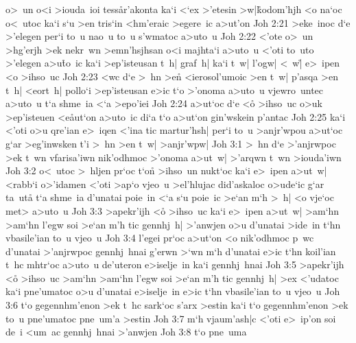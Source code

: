 o>~un
o<i
>iouda~ioi
tess\r{a}r'akonta
ka`i
<`ex
>'etesin
>w|\r{k}odom'hjh
<o
na`oc
o<~utoc
ka`i
s`u
>en
tris`in
<hm'eraic
>egere~ic
a>ut'on\bibvsend
\vs Joh 2:21
>eke~inoc
d`e
>'elegen
per`i
to~u
nao~u
to~u
s'wmatoc
a>uto~u\bibvsend
\vs Joh 2:22
<'ote
o>~un
>hg'erjh
>ek
nekr~wn
>emn'hsjhsan
o<i
majhta`i
a>uto~u
<'oti
to~uto
>'elegen
a>u\r{t}o~ic
ka`i
>ep'isteusan
t~h|
graf~h|
ka`i
t~w|
l'ogw|
<~w|\r{}
e>~ipen
<o
>ihso~uc\bibvsend
\vs Joh 2:23
<wc
d`e
>~hn
>e\r{n}
<ierosol'umoic
>en
t~w|
p'asqa
>en
t~h|
<eort~h|
pollo`i
>ep'isteusan
e>ic
t`o
>'onoma
a>uto~u
vjewro~untec
a>uto~u
t`a
shme~ia
<`a
>epo'iei\bibvsend
\vs Joh 2:24
a>ut`oc
d`e
<o\r{}
>ihso~uc
o>uk
>ep'isteuen
<e\r{a}ut`on
a>uto~ic
di`a
t`o
a>ut`on
gin'wskein
p'antac\bibvsend
\vs Joh 2:25
ka`i
<'oti
o>u
qre'ian
e>~iqen
<'ina
tic
martur'hsh|
per`i
to~u
>anjr'wpou
a>ut`oc
g`ar
>eg'inwsken
t'i
>~hn
>en
t~w|
>anjr'wpw|\bibvsend
\vs Joh 3:1
>~hn
d`e
>'anjrwpoc
>ek
t~wn
vfarisa'iwn
nik'odhmoc
>'onoma
a>ut~w|
>'arqwn
t~wn
>iouda'iwn\bibvsend
\vs Joh 3:2
o<~utoc
>~hljen
pr`oc
t`on\r{}
>ihso~un
nukt`oc
ka`i
e>~ipen
a>ut~w|
<rabb`i
o>'idamen
<'oti
>ap`o
vjeo~u
>el'hlujac
did'askaloc
o>ude`ic
g`ar
ta~uta\r{}
t`a
shme~ia
d'unatai
poie~in
<`a
s`u
poie~ic
>e`an
m`h
>~h|
<o
vje`oc
met>
a>uto~u\bibvsend
\vs Joh 3:3
>apekr'ijh
<o\r{}
>ihso~uc
ka`i
e>~ipen
a>ut~w|
>am`hn
>am`hn
l'egw
soi
>e`an
m'h
tic
gennhj~h|
>'anwjen
o>u
d'unatai
>ide~in
t`hn
vbasile'ian
to~u
vjeo~u\bibvsend
\vs Joh 3:4
l'egei
pr`oc
a>ut`on
<o
nik'odhmoc
p~wc
d'unatai
>'anjrwpoc
gennhj~hnai
g'erwn
>`wn
m`h
d'unatai
e>ic
t`hn
koil'ian
t~hc
mhtr`oc
a>uto~u
de'uteron
e>iselje~in
ka`i
gennhj~hnai\bibvsend
\vs Joh 3:5
>apekr'ijh
<o\r{}
>ihso~uc
>am`hn
>am`hn
l'egw
soi
>e`an
m'h
tic
gennhj~h|
>ex
<'udatoc
ka`i
pne'umatoc
o>u
d'unatai
e>iselje~in
e>ic
t`hn
vbasile'ian
to~u
vjeo~u\bibvsend
\vs Joh 3:6
t`o
gegennhm'enon
>ek
t~hc
sark`oc
s'arx
>estin
ka`i
t`o
gegennhm'enon
>ek
to~u
pne'umatoc
pne~um'a
>estin\bibvsend
\vs Joh 3:7
m`h
vjaum'ash|c
<'oti
e>~ip'on
soi
de~i
<um~ac
gennhj~hnai
>'anwjen\bibvsend
\vs Joh 3:8
t`o
pne~uma
